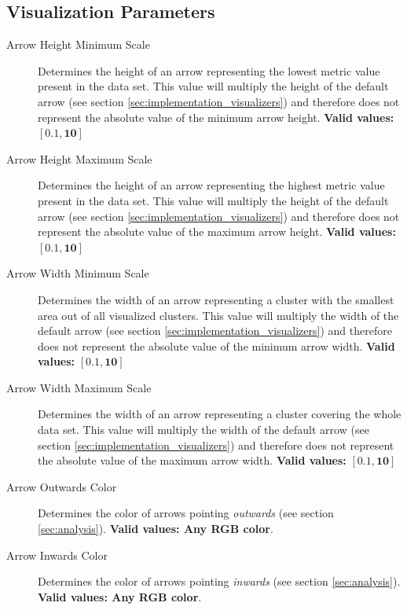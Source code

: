 \subsection{Visualization Parameters}
\label{sec:visualization_parameters}

\begin{description}
\item [Arrow Height Minimum Scale] Determines the height of an arrow representing the lowest metric value present in the data set. This value will multiply the height of the default arrow (see section \ref{sec:implementation_visualizers}) and therefore does not represent the absolute value of the minimum arrow height. {\bf Valid values:} \(\bm{[0.1,10]}\)

\item [Arrow Height Maximum Scale] Determines the height of an arrow representing the highest metric value present in the data set. This value will multiply the height of the default arrow (see section \ref{sec:implementation_visualizers}) and therefore does not represent the absolute value of the maximum arrow height. {\bf Valid values:} \(\bm{[0.1,10]}\)

\item [Arrow Width Minimum Scale] Determines the width of an arrow representing a cluster with the smallest area out of all visualized clusters. This value will multiply the width of the default arrow (see section \ref{sec:implementation_visualizers}) and therefore does not represent the absolute value of the minimum arrow width. {\bf Valid values:} \(\bm{[0.1,10]}\)

\item [Arrow Width Maximum Scale] Determines the width of an arrow representing a cluster covering the whole data set. This value will multiply the width of the default arrow (see section \ref{sec:implementation_visualizers}) and therefore does not represent the absolute value of the maximum arrow width. {\bf Valid values:} \(\bm{[0.1,10]}\)

\item [Arrow Outwards Color] Determines the color of arrows pointing {\it outwards} (see section \ref{sec:analysis}). {\bf Valid values: Any RGB color}.

\item [Arrow Inwards Color] Determines the color of arrows pointing {\it inwards} (see section \ref{sec:analysis}). {\bf Valid values: Any RGB color}.


\end{description}
